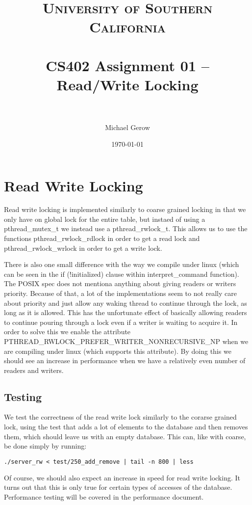 \documentclass[paper=a4, fontsize=11pt]{scrartcl} %
\title{	
\normalfont \normalsize 
\textsc{University of Southern California} \\ [25pt] %
\horrule{0.5pt} \\[0.4cm] %
\huge CS402 Assignment 01 -- Read/Write Locking \\ %
\horrule{2pt} \\[0.5cm] %
}
\author{Michael Gerow} %
\date{\normalsize\today} %
\numberwithin{equation}{section} %
\numberwithin{figure}{section} %
\numberwithin{table}{section} %
\begin{document}
\maketitle %


\section{Read Write Locking}
Read write locking is implemented similarly to coarse grained locking in that we only have on global lock for the entire table, but instaed of using a pthread\_mutex\_t we instead use a pthread\_rwlock\_t. This allows us to use the functions pthread\_rwlock\_rdlock in order to get a read lock and pthread\_rwlock\_wrlock in order to get a write lock.

There is also one small difference with the way we compile under linux (which can be seen in the if (!initialized) clause within interpret\_command function).  The POSIX spec does not mentiona anything about giving readers or writers priority.  Because of that, a lot of the implementations seem to not really care about priority and just allow any waking thread to continue through the lock, as long as it is allowed.  This has the unfortunate effect of basically allowing readers to continue pouring through a lock even if a writer is waiting to acquire it.  In order to solve this we enable the attribute PTHREAD\_RWLOCK\_PREFER\_WRITER\_NONRECURSIVE\_NP when we are compiling under linux (which supports this attribute).  By doing this we should see an increase in performance when we have a relatively even number of readers and writers.

\subsection{Testing}
We test the correctness of the read write lock similarly to the corarse grained lock, using the test that adds a lot of elements to the database and then removes them, which should leave us with an empty database. This can, like with coarse, be done simply by running:

\begin{verbatim}
./server_rw < test/250_add_remove | tail -n 800 | less
\end{verbatim}

Of course, we should also expect an increase in speed for read write locking.  It turns out that this is only true for certain types of accesses of the database. Performance testing will be covered in the performance document.
\end{document}
